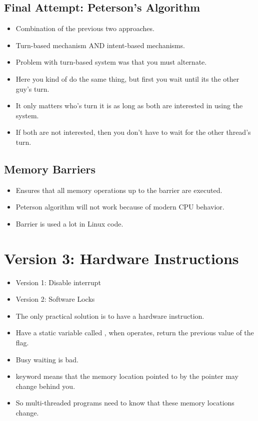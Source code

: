 \documentclass[]{article}
\begin{document}
\subsection{Final Attempt: Peterson's Algorithm}
\begin{itemize}
\item Combination of the previous two approaches.
\item Turn-based mechanism AND intent-based mechanisms.
\item Problem with turn-based system was that you must alternate.
\item Here you kind of do the same thing, but first you wait until its the other
guy's turn.
\item It only matters who's turn it is as long as both are interested in using
the system.
\item If both are not interested, then you don't have to wait for the other
thread's turn.
\end{itemize}

\subsection{Memory Barriers}
\begin{itemize}
\item Ensures that all memory operations up to the barrier are executed.
\item Peterson algorithm will not work because of modern CPU behavior.
\item Barrier is used a lot in Linux code.
\end{itemize}

\section{Version 3: Hardware Instructions}
\begin{itemize}
\item Version 1: Disable interrupt
\item Version 2: Software Locks
\item The only practical solution is to have a hardware instruction.
\item Have a static variable called , when 
operates, return the previous value of the flag.
\item Busy waiting is bad.
\item {} keyword means that the memory location pointed to by the
pointer may change behind you.
\item So multi-threaded programs need to know that these memory locations
change.
\end{itemize}
\end{document}
